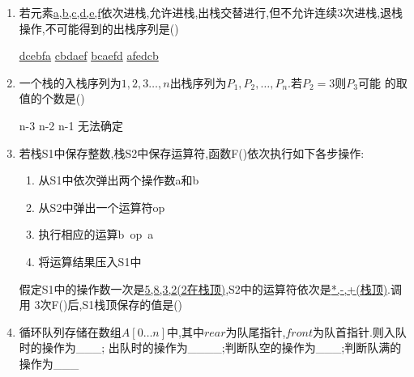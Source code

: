 \documentclass[12pt, a4paper, oneside, UTF8]{ctexbook}
\begin{document}
\begin{enumerate}
    \item \bl 若元素\underline{a,b,c,d,e,f}依次进栈,允许进栈,出栈交替进行,但不允许连续3次进栈,退栈
    操作,不可能得到的出栈序列是() 
    \begin{choices}
        \task \underline{dcebfa}
        \task \underline{cbdaef}
        \task \underline{bcaefd}
        \task \underline{afedcb} 
    \end{choices}


    \item \bl 一个栈的入栈序列为\underline{$1,2,3\ldots,n$}出栈序列为$P_1,P_2,\ldots,P_n$.若$P_2=3$则$P_3$可能 
    的取值的个数是() 
    \begin{choices}
        \task n-3
        \task n-2
        \task n-1
        \task 无法确定 
    \end{choices}

    \item \bl 若栈S1中保存整数,栈S2中保存运算符,函数F()依次执行如下各步操作: 
    \begin{enumerate}[label= (\arabic*)]
        \item 从S1中依次弹出两个操作数a和b
        \item 从S2中弹出一个运算符op
        \item 执行相应的运算b\ op\ a 
        \item 将运算结果压入S1中 
    \end{enumerate}
    假定S1中的操作数一次是\underline{5,8,3,2(2在栈顶)},S2中的运算符依次是\underline{*,-,+(栈顶)}.调用
    3次F()后,S1栈顶保存的值是() 
    \begin{choices}
    \end{choices}

    \item 循环队列存储在数组$A[0\ldots n]$中,其中$rear$为队尾指针,$front$为队首指针.则入队时的操作为\_\_\_;
    出队时的操作为\_\_\_\_;判断队空的操作为\_\_\_;判断队满的操作为\_\_\_


\end{enumerate}
\end{document}
